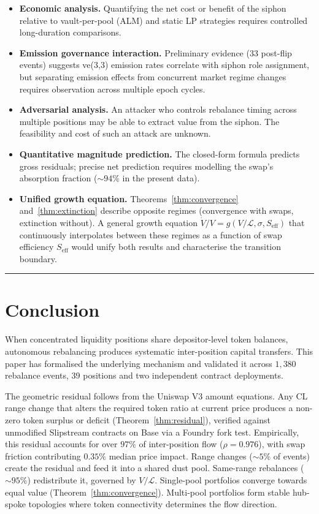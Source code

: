 \documentclass[11pt,a4paper]{article}
\begin{document}
\begin{itemize}[leftmargin=*]
    \item \textbf{Economic analysis.} Quantifying the net cost or benefit of the siphon relative to vault-per-pool (ALM) and static LP strategies requires controlled long-duration comparisons.
    \item \textbf{Emission governance interaction.} Preliminary evidence (33 post-flip events) suggests ve(3,3) emission rates correlate with siphon role assignment, but separating emission effects from concurrent market regime changes requires observation across multiple epoch cycles.
    \item \textbf{Adversarial analysis.} An attacker who controls rebalance timing across multiple positions may be able to extract value from the siphon. The feasibility and cost of such an attack are unknown.
    \item \textbf{Quantitative magnitude prediction.} The closed-form formula predicts gross residuals; precise net prediction requires modelling the swap's absorption fraction (${\sim}94\%$ in the present data).
    \item \textbf{Unified growth equation.} Theorems~\ref{thm:convergence} and~\ref{thm:extinction} describe opposite regimes (convergence with swaps, extinction without). A general growth equation $\dot{V}/V = g(V/\mathcal{L}, \sigma, S_{\text{eff}})$ that continuously interpolates between these regimes as a function of swap efficiency $S_{\text{eff}}$ would unify both results and characterise the transition boundary.
\end{itemize}

\begin{center}\rule{0.5\linewidth}{0.5pt}\end{center}

\section{Conclusion}\label{sec:conclusion}

When concentrated liquidity positions share depositor-level token balances, autonomous rebalancing produces systematic inter-position capital transfers. This paper has formalised the underlying mechanism and validated it across $1{,}380$ rebalance events, 39 positions and two independent contract deployments.

The geometric residual follows from the Uniswap V3 amount equations. Any CL range change that alters the required token ratio at current price produces a non-zero token surplus or deficit (Theorem~\ref{thm:residual}), verified against unmodified Slipstream contracts on Base via a Foundry fork test. Empirically, this residual accounts for over $97\%$ of inter-position flow ($\rho = 0.976$), with swap friction contributing $0.35\%$ median price impact. Range changes (${\sim}5\%$ of events) create the residual and feed it into a shared dust pool. Same-range rebalances (${\sim}95\%$) redistribute it, governed by $V/\mathcal{L}$. Single-pool portfolios converge towards equal value (Theorem~\ref{thm:convergence}). Multi-pool portfolios form stable hub-spoke topologies where token connectivity determines the flow direction.
\end{document}
